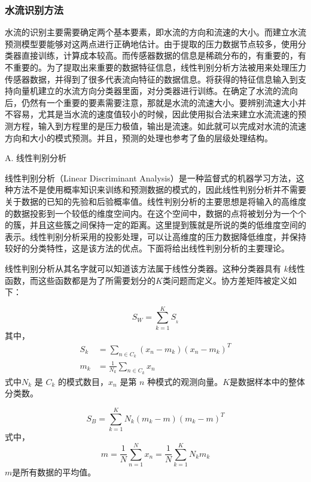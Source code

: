 \subsubsection{ 水流识别方法 }

水流的识别主要需要确定两个基本要素，即水流的方向和流速的大小。而建立水流预测模型要能够对这两点进行正确地估计。由于提取的压力数据节点较多，使用分类器直接训练，计算成本较高。而传感器数据的信息是稀疏分布的，有重要的，有不重要的。为了提取出来重要的数据特征信息，线性判别分析方法被用来处理压力传感器数据，并得到了很多代表流向特征的数据信息。将获得的特征信息输入到支持向量机建立的水流方向分类器里面，对分类器进行训练。在确定了水流的流向后，仍然有一个重要的要素需要注意，那就是水流的流速大小。要辨别流速大小并不容易，尤其是当水流的速度值较小的时候，因此使用拟合法来建立水流流速的预测方程，输入到方程里的是压力极值，输出是流速。如此就可以完成对水流的流速方向和大小的模式预测。并且，预测的处理也参考了鱼的层级处理结构\cite{yang2010artificial}。

A. {线性判别分析}

线性判别分析（{Linear Discriminant Analysis}）是一种监督式的机器学习方法，这种方法不是使用概率知识来训练和预测数据的模式的，因此线性判别分析并不需要关于数据的已知的先验和后验概率值。线性判别分析的主要思想是将输入的高维度的数据投影到一个较低的维度空间内。在这个空间中，数据的点将被划分为一个个的簇，并且这些簇之间保持一定的距离。这里提到簇就是所说的类的低维度空间的表示。线性判别分析采用的投影处理，可以让高维度的压力数据降低维度，并保持较好的分类特性，这是该方法的优点。下面将给出线性判别分析的主要理论。

线性判别分析从其名字就可以知道该方法属于线性分类器。这种分类器具有 $k$线性函数，而这些函数都是为了所需要划分的$K$类问题而定义。协方差矩阵被定义如下\cite{martis2013ecg,chen2000new}：

\begin{equation}
{S_W} = \sum\limits_{k = 1}^K {{S_{_k}}}
\label{eq:chap3:19}
\end{equation}
其中，
\begin{equation*}
\begin{aligned}
{S_k} &= \sum\limits_{n \in {C_k}} {\left( {{x_n} - {m_k}} \right){{\left( {{x_n} - {m_k}} \right)}^T}}\\
{m_k} &= \frac{1}{{{N_k}}}\sum\limits_{n \in {C_k}} {{x_n}}
\end{aligned}
\end{equation*}
式中$N_k$ 是 $C_k$ 的模式数目，$x_n$ 是第 $n$ 种模式的观测向量。$K$是数据样本中的整体分类数。

\begin{equation}
{S_B} = \sum\limits_{k = 1}^K {{N_k}\left( {{m_k} - m} \right){{\left( {{m_k} - m} \right)}^T}}
\label{eq:chap3:20}
\end{equation}
式中，
\begin{equation*}
m = \frac{1}{N}\sum\limits_{n = 1}^N {{x_n}}  = \frac{1}{N}\sum\limits_{k = 1}^K {{N_k}{m_k}}
\end{equation*}
$m$是所有数据的平均值。

